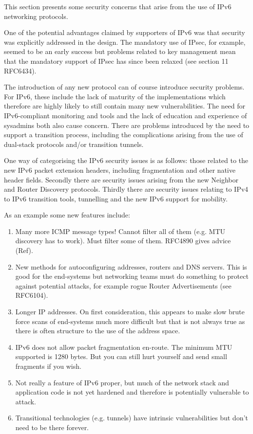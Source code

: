 This section presents some security concerns that arise from the use of IPv6 networking protocols. 

One of the potential advantages claimed by supporters of IPv6 was that security was explicitly addressed in the design. The mandatory use of IPsec, for example, seemed to be an early success but problems related to key management mean that the mandatory support of IPsec has since been relaxed (see section 11 RFC6434). 

The introduction of any new protocol can of course introduce security problems. For IPv6, these include the lack of maturity of the implementations which therefore are highly likely to still contain many new vulnerabilities. The need for IPv6-compliant monitoring and tools and the lack of education and experience of sysadmins both also cause concern. There are problems introduced by the need to support a transition process, including the complications arising from the use of dual-stack protocols and/or transition tunnels.

One way of categorising the IPv6 security issues is as follows: those related to the new IPv6 packet extension headers, including fragmentation and other native header fields. Secondly there are security issues arising from the new Neighbor and Router Discovery protocols. Thirdly there are security issues relating to IPv4 to IPv6 transition tools, tunnelling and the new IPv6 support for mobility.

As an example some new features include:

\begin{enumerate}

\item Many more ICMP message types! Cannot filter all of them (e.g. MTU discovery has to work). Must filter some of them. RFC4890 gives advice (Ref).

\item New methods for autoconfiguring addresses, routers and DNS servers. This is good for the end-systems but networking teams must do something to protect against potential attacks, for example rogue Router Advertisements (see RFC6104).

\item Longer IP addresses. On first consideration, this appears to make slow brute force scans of end-systems much more difficult but that is not always true as there is often structure to the use of the address space. 

\item IPv6 does not allow packet fragmentation en-route.  The minimum MTU supported is 1280 bytes. But you can still hurt yourself and send small fragments if you wish. 

\item Not really a feature of IPv6 proper, but much of the network stack and application code is not yet hardened and therefore is potentially vulnerable to attack.

\item Transitional technologies (e.g. tunnels) have intrinsic vulnerabilities but don't need to be there forever.

\end{enumerate}

